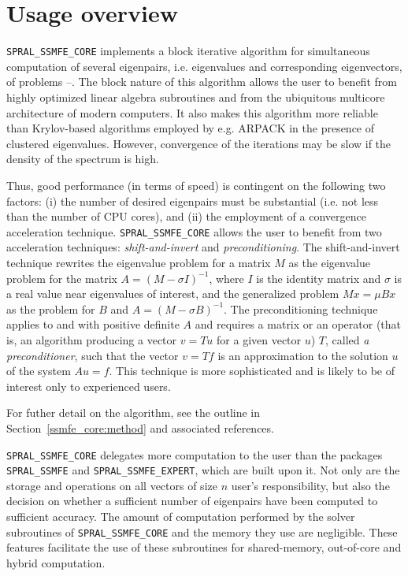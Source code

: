 \section{Usage overview}

\texttt{SPRAL\_SSMFE\_CORE}
implements a block iterative algorithm
for simultaneous computation of several eigenpairs,
i.e. eigenvalues and corresponding eigenvectors,
of problems --.
The block nature of this algorithm allows the user
to benefit from highly optimized linear algebra subroutines
and from the ubiquitous multicore architecture
of modern computers.
It also makes this algorithm more reliable
than Krylov-based algorithms employed by e.g. ARPACK
in the presence of clustered eigenvalues.
However, convergence of the iterations may be slow
if the density of the spectrum is high.

Thus, good performance 
(in terms of speed)
is contingent on the following two factors:
(i) the number of desired
eigenpairs must be substantial
(i.e. not less than the number of CPU cores),
and
(ii) the employment of a convergence acceleration technique.
\texttt{SPRAL\_SSMFE\_CORE} allows the user to benefit
from two acceleration techniques:
{\em shift-and-invert} and {\em preconditioning}.
The shift-and-invert technique 
rewrites the eigenvalue problem for a matrix $M$ 
as the eigenvalue problem  for the matrix
$A = (M - \sigma I)^{-1}$,
where $I$ is the identity matrix
and $\sigma$ is a real value near eigenvalues of interest,
and the generalized problem $M x = \mu B x$
as the problem 
for $B$ and 
$A = (M - \sigma B)^{-1}$. 
The preconditioning technique applies to 
 and  with positive definite $A$ and
requires a matrix or an operator (that is, an algorithm producing a vector $v = T u$ for a given
vector $u$)
$T$, called {\em a preconditioner},
such that the vector
$v = T f$ is an approximation to the solution $u$
of the system $A u = f$.
This technique is more sophisticated
and is likely to be of interest only to experienced users.

For futher detail on the algorithm, see the outline in Section~\ref{ssmfe_core:method}
and associated references.

\texttt{SPRAL\_SSMFE\_CORE} delegates 
more computation to the user than the packages
\texttt{SPRAL\_SSMFE} and \texttt{SPRAL\_SSMFE\_EXPERT}, which are built upon it.
Not only are the storage and operations on all vectors of size $n$
user's responsibility, but also
the decision on 
whether a sufficient number of eigenpairs have been computed
to sufficient accuracy.
The amount of computation performed by 
the solver subroutines of \texttt{SPRAL\_SSMFE\_CORE}
and the memory they use are negligible. 
These features facilitate the use of these subroutines
for shared-memory, out-of-core and hybrid computation.

